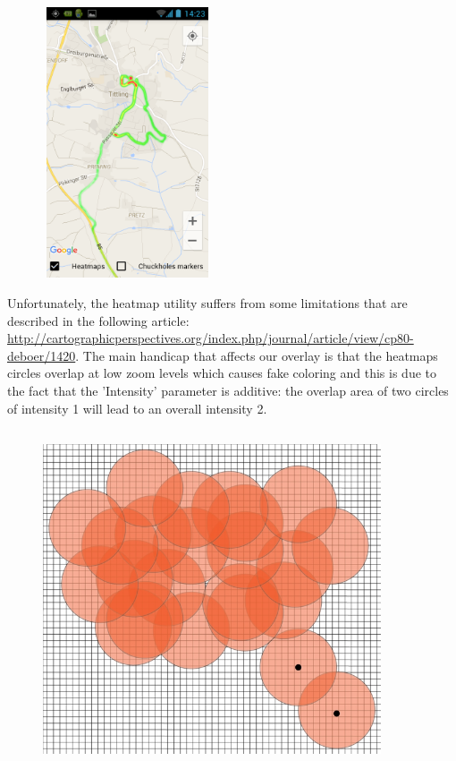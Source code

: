 \documentclass[10pt,a4paper]{article} %
\begin{document}
    \begin{figure}[H]
    \centering
	
	  
	   
       \includegraphics[width=5cm, height=8cm]{pic4}
    
       
        \end{figure}
    
    Unfortunately, the heatmap utility suffers from some limitations that are described in the following article: 
    \url{http://cartographicperspectives.org/index.php/journal/article/view/cp80-deboer/1420}. The main handicap that affects our overlay is that the heatmaps circles overlap at low zoom levels which causes fake coloring and this is due to the fact that the 'Intensity' parameter is additive: the overlap area of two circles of intensity 1 will lead to an overall intensity 2.
    \begin{figure}[H]
    \centering
	
	  
	   
       \includegraphics[width=10cm, height=10cm]{pic6}
    
       
        \end{figure}
    
\end{document}

